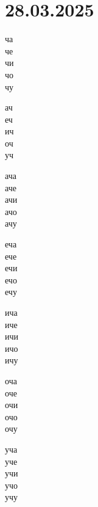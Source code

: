 \documentclass[a5paper,12pt]{article}
\begin{document}
\section{28.03.2025}
\begin{minipage}[t]{0.45\textwidth}
  ча\\ че\\ чи\\ чо\\ чу
\end{minipage}
\hfill
\begin{minipage}[t]{0.45\textwidth}
  ач\\ еч\\ ич\\ оч\\ уч
\end{minipage}

\vspace{1cm}

\noindent
\begin{minipage}[t]{0.18\textwidth}
  ача\\ аче\\ ачи\\ ачо\\ ачу
\end{minipage}
\hfill
\begin{minipage}[t]{0.18\textwidth}
  еча\\ ече\\ ечи\\ ечо\\ ечу
\end{minipage}
\hfill
\begin{minipage}[t]{0.18\textwidth}
  ича\\ иче\\ ичи\\ ичо\\ ичу
\end{minipage}
\hfill 
\begin{minipage}[t]{0.18\textwidth}
  оча\\ оче\\ очи\\ очо\\ очу
\end{minipage}
\hfill 
\begin{minipage}[t]{0.18\textwidth}
  уча\\ уче\\ учи\\ учо\\ учу
\end{minipage}
\end{document}
